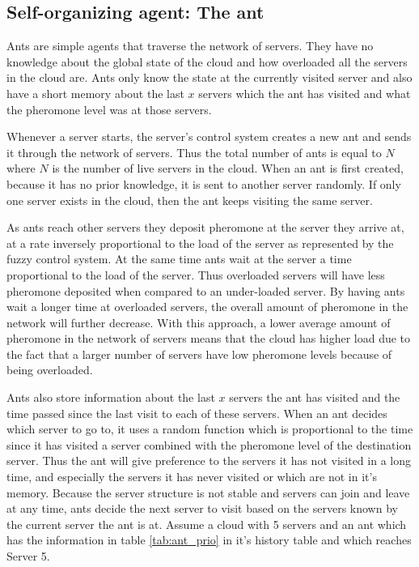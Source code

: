\subsection{Self-organizing agent: The ant}

Ants are simple agents that traverse the network of servers. They have no knowledge about the global state of the cloud and how overloaded all the servers in the cloud are. Ants only know the state at the currently visited server and also have a short memory about the last $x$ servers which the ant has visited and what the pheromone level was at those servers.

Whenever a server starts, the server's control system creates a new ant and sends it through the network of servers. Thus the total number of ants is equal to $N$ where $N$ is the number of live servers in the cloud. When an ant is first created, because it has no prior knowledge, it is sent to another server randomly. If only one server exists in the cloud, then the ant keeps visiting the same server.

As ants reach other servers they deposit pheromone at the server they arrive at, at a rate inversely proportional to the load of the server as represented by the fuzzy control system. At the same time ants wait at the server a time proportional to the load of the server. Thus overloaded servers will have less pheromone deposited when compared to an under-loaded server. By having ants wait a longer time at overloaded servers, the overall amount of pheromone in the network will further decrease. With this approach, a lower average amount of pheromone in the network of servers means that the cloud has higher load due to the fact that a larger number of servers have low pheromone levels because of being overloaded.

Ants also store information about the last $x$ servers the ant has visited and the time passed since the last visit to each of these servers. When an ant decides which server to go to, it uses a random function which is proportional to the time since it has visited a server combined with the pheromone level of the destination server. Thus the ant will give preference to the servers it has not visited in a long time, and especially the servers it has never visited or which are not in it's memory. Because the server structure is not stable and servers can join and leave at any time, ants decide the next server to visit based on the servers known by the current server the ant is at.  Assume a cloud with 5 servers and an ant which has the information in table \ref{tab:ant_prio} in it's history table and which reaches Server 5.

